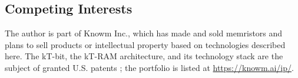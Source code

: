 \documentclass[reprint,amsmath,amssymb,aps,nofootinbib]{revtex4-2}
\begin{document}
\subsection*{Competing Interests}

The author is part of Knowm Inc., which has made and sold memristors and
plans to sell products or intellectual property based on technologies
described here. The kT-bit, the
kT-RAM architecture, and its technology stack are the subject of
granted U.S. patents
\cite{nugent2015ktbitpatent,nugent2017ktrampatent,nugent2019stackpatent};
the portfolio is listed at \url{https://knowm.ai/ip/}.


\end{document}
